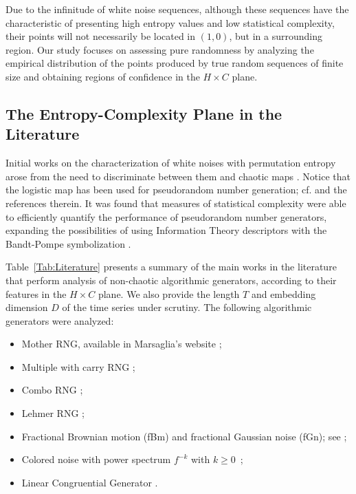 \documentclass[alpha-refs]{wiley-article}
\begin{document}
Due to the infinitude of white noise sequences, although these sequences have the characteristic of presenting high entropy values and low statistical complexity, their points will not necessarily be located in $(1, 0)$, but in a surrounding region.
Our study focuses on assessing pure randomness by analyzing the empirical distribution of the points produced by true random sequences of finite size and obtaining regions of confidence in the $H \times C$ plane.

\subsection{The Entropy-Complexity Plane in the Literature}\label{Sec:BPApplications}

Initial works on the characterization of white noises with permutation entropy arose from the need to discriminate between them and chaotic maps \citep{rosso2013characterization, xiong2020complexity}.
Notice that the logistic map has been used for pseudorandom number generation; cf. \citet{AnalyzingLogisticMapPseudorandomNumberGeneratorsforPeriodicityInducedbyFinitePrecisionFloatingPointRepresentation} and the references therein.
It was found that measures of statistical complexity were able to efficiently quantify the performance of pseudorandom number generators, expanding the possibilities of using Information Theory descriptors with the Bandt-Pompe symbolization \citep{larrondo2013statistical, gonzalez2005statistical}.

Table~\ref{Tab:Literature} presents a summary of the main works in the literature that perform analysis of non-chaotic algorithmic generators, according to their features in the $H\times C$ plane.
We also provide the length $T$ and embedding dimension $D$ of the time series under scrutiny.
The following algorithmic generators were analyzed:
\begin{itemize}
\item Mother RNG, available in Marsaglia's website \citep[MOT,][]{marsaglia1994yet};
\item Multiple with carry RNG \citep[MWC,][]{marsaglia1994yet};
\item Combo RNG \citep[COM,][]{marsaglia1994yet};
\item Lehmer RNG \citep[LEH,][]{payne1969coding};
\item Fractional Brownian motion (fBm) and fractional Gaussian noise (fGn); see \citet{bardet2003generators};
\item Colored noise with power spectrum $f^{-k}$ with $k \geq 0$~\citep{larrondo2012matlab};
\item Linear Congruential Generator \citep[LCG,][]{knuth1997sorting}.
\end{itemize}
\end{document}

